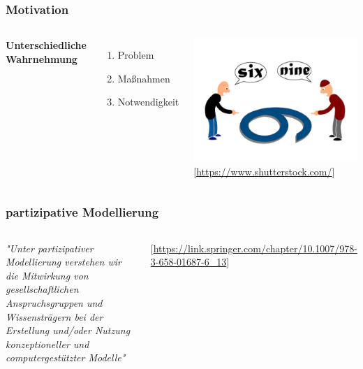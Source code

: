 \documentclass{beamer}
\begin{document}
\begin{frame}
\frametitle{Motivation}
\begin{columns}[c] %

\textbf{Unterschiedliche Wahrnehmung}
\begin{enumerate}
\item Problem
\item Maßnahmen
\item Notwendigkeit
\end{enumerate}

\includegraphics[scale=0.35]{perspective.png}
\tiny [\url{https://www.shutterstock.com/}]

\end{columns}
\end{frame}


\begin{frame}
\frametitle{partizipative Modellierung}
\begin{columns}[c] %

\begin{center}
\textit{"Unter partizipativer Modellierung verstehen wir die Mitwirkung von gesellschaftlichen Anspruchsgruppen und Wissensträgern bei der Erstellung und/oder Nutzung konzeptioneller und computergestützter Modelle"}
\end{center}
\tiny [\url{https://link.springer.com/chapter/10.1007/978-3-658-01687-6_13}]

\end{columns}
\end{frame}
\end{document}
